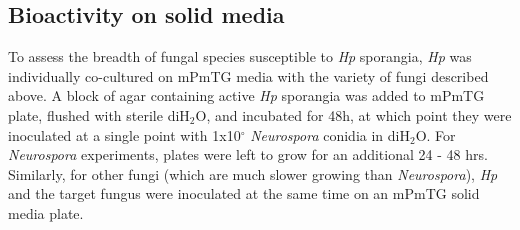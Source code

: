 \subsection{Bioactivity on solid media}
To assess the breadth of fungal species susceptible to \textit{Hp} sporangia, \textit{Hp} was individually co-cultured on mPmTG media with the variety of fungi described above. A block of agar containing active \textit{Hp} sporangia was added to mPmTG plate, flushed with sterile diH$_{2}$O, and incubated for 48h, at which point they were inoculated at a single point with 1x10$^{\circ}$ \textit{Neurospora} conidia in diH$_{2}$O. For \textit{Neurospora} experiments, plates were left to grow for an additional 24 - 48 hrs.\\
\indent Similarly, for other fungi (which are much slower growing than \textit{Neurospora}), \textit{Hp} and the target fungus were inoculated at the same time on an mPmTG solid media plate.\\
